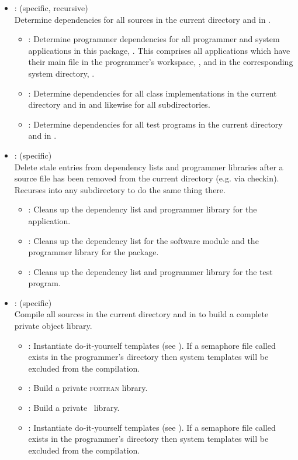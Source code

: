 \begin{itemize}
\item
    : (specific, recursive)
   \\ Determine dependencies for all sources in the current directory and in
   .
   \begin{itemize}
   \item
      : Determine programmer dependencies for all programmer and
      system applications in this package, .  This comprises
      all applications which have their main  file in the
      programmer's workspace, , and in the corresponding
      system directory, .
   \item
      : Determine dependencies for all class implementations in the
      current directory and in  and likewise for all
      subdirectories.
   \item
      : Determine dependencies for all test programs in the current
      directory and in .
   \end{itemize}

\item
    : (specific)
   \\ Delete stale entries from dependency lists and programmer libraries
   after a source file has been removed from the current directory (e.g. via
   checkin).  Recurses into any  subdirectory to do the same
   thing there.
   \begin{itemize}
   \item
      : Cleans up the dependency list and programmer library for the
      application.
   \item
      : Cleans up the dependency list for the software module and
      the programmer library for the package.
   \item
      : Cleans up the dependency list and programmer library for the
      test program.
   \end{itemize}

\item
    : (specific)
   \\ Compile all sources in the current directory and in  to
   build a complete private object library.
   \begin{itemize}
   \item
      : Instantiate do-it-yourself templates (see ).
      If a semaphore file called  exists in the
      programmer's directory then system templates will be excluded from the
      compilation.
   \item
      : Build a private \textsc{fortran} library.
   \item
      : Build a private \cplusplus\ library.
   \item
      : Instantiate do-it-yourself templates (see ).
      If a semaphore file called  exists in the
      programmer's directory then system templates will be excluded from the
      compilation.
   \end{itemize}


\end{itemize}

